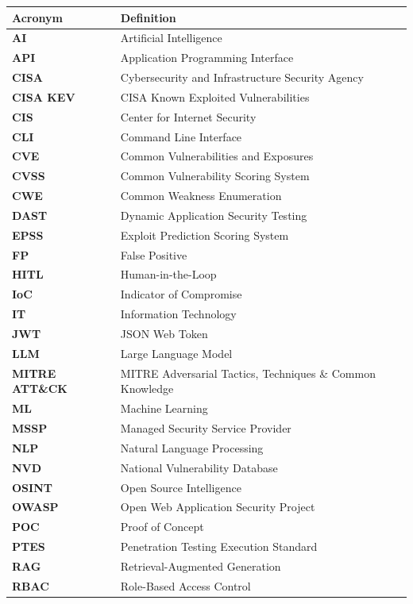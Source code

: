 \documentclass[12pt,a4paper]{report}
\begin{document}
\begin{longtable}{>{\bfseries}p{3.5cm} p{10.5cm}}
\toprule
\textbf{Acronym} & \textbf{Definition} \\
\midrule
\endhead
AI          & Artificial Intelligence \\
API         & Application Programming Interface \\
CISA        & Cybersecurity and Infrastructure Security Agency \\
CISA KEV    & CISA Known Exploited Vulnerabilities \\
CIS         & Center for Internet Security \\
CLI         & Command Line Interface \\
CVE         & Common Vulnerabilities and Exposures \\
CVSS        & Common Vulnerability Scoring System \\
CWE         & Common Weakness Enumeration \\
DAST        & Dynamic Application Security Testing \\
EPSS        & Exploit Prediction Scoring System \\
FP          & False Positive \\
HITL        & Human-in-the-Loop \\
IoC         & Indicator of Compromise \\
IT          & Information Technology \\
JWT         & JSON Web Token \\
LLM         & Large Language Model \\
MITRE ATT\&CK & MITRE Adversarial Tactics, Techniques \& Common Knowledge \\
ML          & Machine Learning \\
MSSP        & Managed Security Service Provider \\
NLP         & Natural Language Processing \\
NVD         & National Vulnerability Database \\
OSINT       & Open Source Intelligence \\
OWASP       & Open Web Application Security Project \\
POC         & Proof of Concept \\
PTES        & Penetration Testing Execution Standard \\
RAG         & Retrieval-Augmented Generation \\
RBAC        & Role-Based Access Control \\

\end{longtable}
\end{document}
